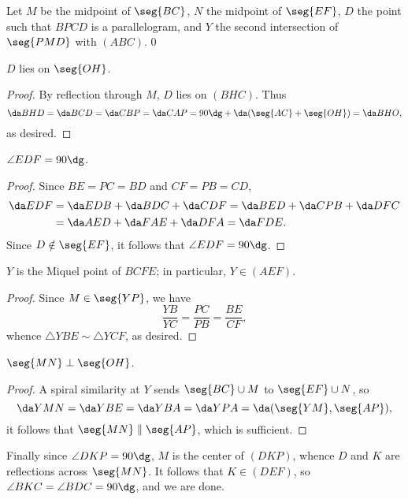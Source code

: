 Let $M$ be the midpoint of $\seg{BC}$, $N$ the midpoint of $\seg{EF}$, $D$ the point such that $BPCD$ is a parallelogram, and $Y$ the second intersection of $\seg{PMD}$ with $(ABC)$.
\setcounter{claim}0
\begin{claim}
    $D$ lies on $\seg{OH}$.
\end{claim}
\begin{proof}
    By reflection through $M$, $D$ lies on $(BHC)$. Thus \[\da BHD=\da BCD=\da CBP=\da CAP=90\dg+\da(\seg{AC}+\seg{OH})=\da BHO,\]
    as desired.
\end{proof}
\begin{claim}
    $\angle EDF=90\dg$.
\end{claim}
\begin{proof}
    Since $BE=PC=BD$ and $CF=PB=CD$,
    \begin{align*}
        \da EDF&=\da EDB+\da BDC+\da CDF=\da BED+\da CPB+\da DFC\\
        &=\da AED+\da FAE+\da DFA=\da FDE.
    \end{align*}
    Since $D\notin\seg{EF}$, it follows that $\angle EDF=90\dg$.
\end{proof}
\begin{claim}
    $Y$ is the Miquel point of $BCFE$; in particular, $Y\in(AEF)$.
\end{claim}
\begin{proof}
    Since $M\in\seg{YP}$, we have \[\frac{YB}{YC}=\frac{PC}{PB}=\frac{BE}{CF},\]
    whence $\triangle YBE\sim\triangle YCF$, as desired.
\end{proof}
\begin{claim}
    $\seg{MN}\perp\seg{OH}$.
\end{claim}
\begin{proof}
    A spiral similarity at $Y$ sends $\seg{BC}\cup M$ to $\seg{EF}\cup N$, so \[\da YMN=\da YBE=\da YBA=\da YPA=\da(\seg{YM},\seg{AP}),\]
    it follows that $\seg{MN}\parallel\seg{AP}$, which is sufficient.
\end{proof}

Finally since $\angle DKP=90\dg$, $M$ is the center of $(DKP)$, whence $D$ and $K$ are reflections across $\seg{MN}$. It follows that $K\in(DEF)$, so $\angle BKC=\angle BDC=90\dg$, and we are done.
